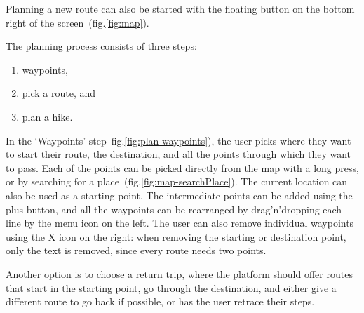 Planning a new route can also be started with the floating button on the bottom right of the screen~(fig.\ref{fig:map}).

The planning process consists of three steps:
\begin{enumerate}
    \item waypoints,
    \item pick a route, and
    \item plan a hike.
\end{enumerate}

In the `Waypoints' step~fig.\ref{fig:plan-waypoints}), the user picks where they want to start their route, the destination, and all the points through which they want to pass.
Each of the points can be picked directly from the map with a long press, or by searching for a place~(fig.\ref{fig:map-searchPlace}).
The current location can also be used as a starting point.
The intermediate points can be added using the plus button, and all the waypoints can be rearranged by drag'n'dropping each line by the menu icon on the left.
The user can also remove individual waypoints using the X icon on the right: when removing the starting or destination point, only the text is removed, since every route needs two points.

Another option is to choose a return trip, where the platform should offer routes that start in the starting point, go through the destination, and either give a different route to go back if possible, or has the user retrace their steps.

